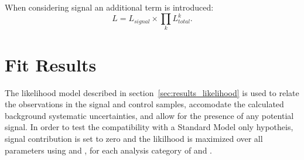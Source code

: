 When considering signal an additional term is introduced:
% 
\begin{equation}
L = L_{signal} \times \prod_k L^k_{total} .
\label{eq:total_likelihood_wsignal}
\end{equation}
% 







\section{Fit Results}  %
\label{sec:results_fit}
The likelihood model described in section~\ref{sec:results_likelihood} is used
to relate the observations in the signal and control samples, accomodate the
calculated background systematic uncertainties, and allow for the presence of
any potential signal. In order to test the compatibility with a Standard
Model only hypotheis, signal contribution is set to zero and the likilhood is
maximized over all parameters using \ROOFIT \cite{roofit} and \MINUIT
\cite{James:1975dr}, for each analysis category of \nb and \nj.

